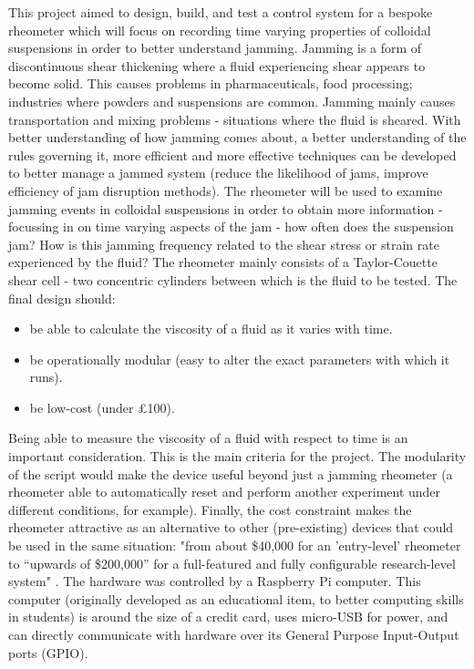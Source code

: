 \documentclass[twoside,a4]{report}
\def\br{\newline \newline \noindent}
\begin{document}
	This project aimed to design, build, and test a control system for a bespoke rheometer which will focus on recording time varying properties of colloidal suspensions in order to better understand jamming. Jamming is a form of discontinuous shear thickening where a fluid experiencing shear appears to become solid. This causes problems in pharmaceuticals, food processing; industries where powders and suspensions are common. Jamming mainly causes transportation and mixing problems - situations where the fluid is sheared. With better understanding of how jamming comes about, a better understanding of the rules governing it, more efficient and more effective techniques can be developed to better manage a jammed system (reduce the likelihood of jams, improve efficiency of jam disruption methods).
	\br
	The rheometer will be used to examine jamming events in colloidal suspensions in order to obtain more information - focussing in on time varying aspects of the jam - how often does the suspension jam? How is this jamming frequency related to the shear stress or strain rate experienced by the fluid? The rheometer mainly consists of a Taylor-Couette shear cell - two concentric cylinders between which is the fluid to be tested. The final design should:
	\begin{itemize}
		\item be able to calculate the viscosity of a fluid as it varies with time.
		\item be operationally modular (easy to alter the exact parameters with which it runs).
		\item be low-cost (under \pounds 100).
	\end{itemize}
	Being able to measure the viscosity of a fluid with respect to time is an important consideration. This is the main criteria for the project. The modularity of the script would make the device useful beyond just a jamming rheometer (a rheometer able to automatically reset and perform another experiment under different conditions, for example). Finally, the cost constraint makes the rheometer attractive as an alternative to other (pre-existing) devices that could be used in the same situation: "from about \$40,000 for an 'entry-level' rheometer to “upwards of \$200,000” for a full-featured and fully configurable research-level system" \cite{refrheomprice}.
	\br
	The hardware was controlled by a Raspberry Pi computer. This computer (originally developed as an educational item, to better computing skills in students) is around the size of a credit card, uses micro-USB for power, and can directly communicate with hardware over its General Purpose Input-Output ports (GPIO).
\end{document}
